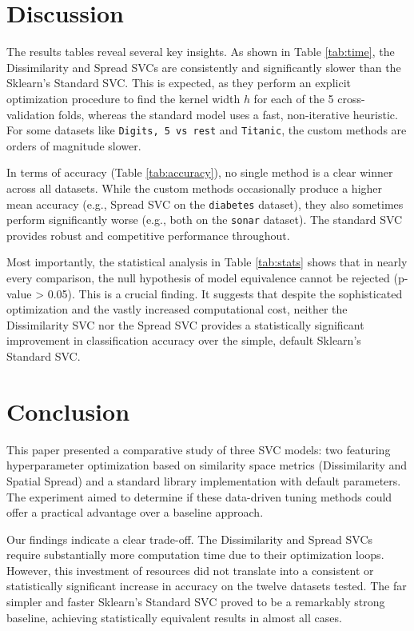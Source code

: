 \documentclass[conference]{IEEEtran}
\begin{document}
\section{Discussion}
The results tables reveal several key insights. As shown in Table \ref{tab:time}, the Dissimilarity and Spread SVCs are consistently and significantly slower than the Sklearn's Standard SVC. This is expected, as they perform an explicit optimization procedure to find the kernel width $h$ for each of the 5 cross-validation folds, whereas the standard model uses a fast, non-iterative heuristic. For some datasets like \texttt{Digits, 5 vs rest} and \texttt{Titanic}, the custom methods are orders of magnitude slower.

In terms of accuracy (Table \ref{tab:accuracy}), no single method is a clear winner across all datasets. While the custom methods occasionally produce a higher mean accuracy (e.g., Spread SVC on the \texttt{diabetes} dataset), they also sometimes perform significantly worse (e.g., both on the \texttt{sonar} dataset). The standard SVC provides robust and competitive performance throughout.

Most importantly, the statistical analysis in Table \ref{tab:stats} shows that in nearly every comparison, the null hypothesis of model equivalence cannot be rejected (p-value > 0.05). This is a crucial finding. It suggests that despite the sophisticated optimization and the vastly increased computational cost, neither the Dissimilarity SVC nor the Spread SVC provides a statistically significant improvement in classification accuracy over the simple, default Sklearn's Standard SVC.

\section{Conclusion}
This paper presented a comparative study of three SVC models: two featuring hyperparameter optimization based on similarity space metrics (Dissimilarity and Spatial Spread) and a standard library implementation with default parameters. The experiment aimed to determine if these data-driven tuning methods could offer a practical advantage over a baseline approach.

Our findings indicate a clear trade-off. The Dissimilarity and Spread SVCs require substantially more computation time due to their optimization loops. However, this investment of resources did not translate into a consistent or statistically significant increase in accuracy on the twelve datasets tested. The far simpler and faster Sklearn's Standard SVC proved to be a remarkably strong baseline, achieving statistically equivalent results in almost all cases.
\end{document}
